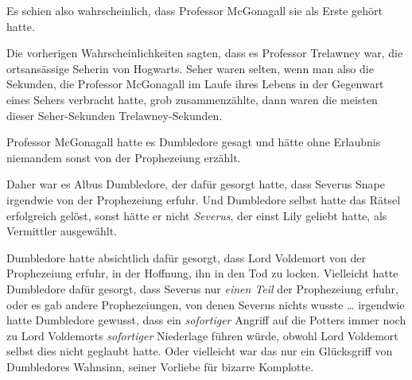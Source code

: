 Es schien also wahrscheinlich, dass Professor McGonagall sie als Erste gehört hatte.

Die vorherigen Wahrscheinlichkeiten sagten, dass es Professor Trelawney war, die ortsansässige Seherin von Hogwarts. Seher waren selten, wenn man also die Sekunden, die Professor McGonagall im Laufe ihres Lebens in der Gegenwart eines Sehers verbracht hatte, grob zusammenzählte, dann waren die meisten dieser Seher-Sekunden Trelawney-Sekunden.

Professor McGonagall hatte es Dumbledore gesagt und hätte ohne Erlaubnis niemandem sonst von der Prophezeiung erzählt.

Daher war es Albus Dumbledore, der dafür gesorgt hatte, dass Severus Snape irgendwie von der Prophezeiung erfuhr. Und Dumbledore selbst hatte das Rätsel erfolgreich gelöst, sonst hätte er nicht \emph{Severus}, der einst Lily geliebt hatte, als Vermittler ausgewählt.

Dumbledore hatte absichtlich dafür gesorgt, dass Lord Voldemort von der Prophezeiung erfuhr, in der Hoffnung, ihn in den Tod zu locken. Vielleicht hatte Dumbledore dafür gesorgt, dass Severus nur \emph{einen Teil} der Prophezeiung erfuhr, oder es gab andere Prophezeiungen, von denen Severus nichts wusste … irgendwie hatte Dumbledore gewusst, dass ein \emph{sofortiger} Angriff auf die Potters immer noch zu Lord Voldemorts \emph{sofortiger} Niederlage führen würde, obwohl Lord Voldemort selbst dies nicht geglaubt hatte. Oder vielleicht war das nur ein Glücksgriff von Dumbledores Wahnsinn, seiner Vorliebe für bizarre Komplotte.

